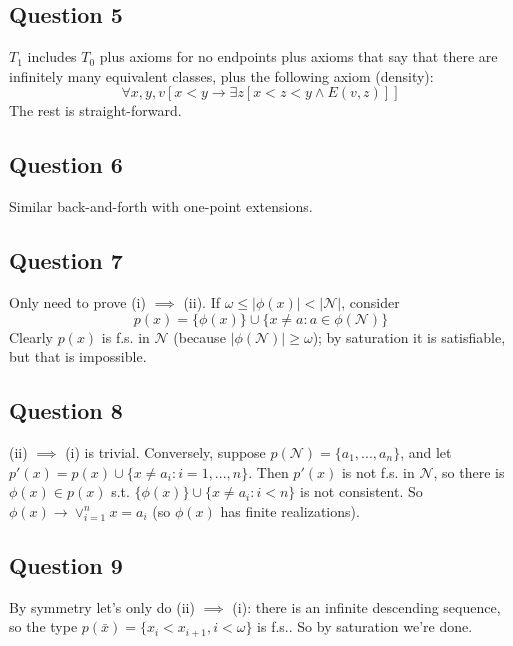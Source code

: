 \documentclass[a4paper]{article}
\begin{document}
\subsection{Question 5}
$T_1$ includes $T_0$ plus axioms for no endpoints plus axioms that say that there are infinitely many equivalent classes, plus the following axiom (density):
$$\forall x,y,v[x < y \to \exists z[x < z < y \wedge E(v,z)]]$$
The rest is straight-forward.

\subsection{Question 6}
Similar back-and-forth with one-point extensions.

\subsection{Question 7}
Only need to prove (i) $\implies$ (ii). If $\omega \leq |\phi(x)| < |\mathcal{N}|$, consider 
$$p(x) = \{\phi(x)\} \cup \{x \neq a : a \in \phi(\mathcal{N})\}$$
Clearly $p(x)$ is f.s. in $\mathcal{N}$ (because $|\phi(\mathcal{N})| \geq \omega$); by saturation it is satisfiable, but that is impossible.

\subsection{Question 8}
(ii) $\implies$ (i) is trivial. Conversely, suppose $p(\mathcal{N}) = \{a_1,...,a_n\}$, and let $p'(x) = p(x) \cup \{x \neq a_i:i=1,...,n\}$. Then $p'(x)$ is not f.s. in $\mathcal{N}$, so there is $\phi(x) \in p(x)$ s.t. $\{\phi(x)\} \cup \{x \neq a_i: i<n\}$ is not consistent. So $\phi(x) \to \vee_{i=1}^n x=a_i$ (so $\phi(x)$ has finite realizations).

\subsection{Question 9}
By symmetry let's only do (ii) $\implies$ (i): there is an infinite descending sequence, so the type $p(\bar{x}) = \{x_i<x_{i+1}, i < \omega\}$ is f.s.. So by saturation we're done.
\end{document}
